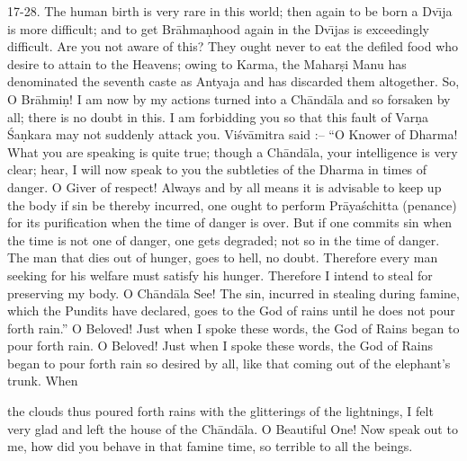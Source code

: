 17-28. The human birth is very rare in this world; then again to be born a Dv\={\i}ja is more difficult; and to get Br\=ahma\d{n}hood again in the Dv\={\i}jas is exceedingly difficult. Are you not aware of this? They ought never to eat the defiled food who desire to attain to the Heavens; owing to Karma, the Mahar\d{s}i Manu has denominated the seventh caste as Antyaja and has discarded them altogether. So, O Br\=ahmi\d{n}! I am now by my actions turned into a Ch\=and\=ala and so forsaken by all; there is no doubt in this. I am forbidding you so that this fault of Var\d{n}a \'Sa\d{n}kara may not suddenly attack you. Vi\'sv\=amitra said :-- ``O Knower of Dharma! What you are speaking is quite true; though a Ch\=and\=ala, your intelligence is very clear; hear, I will now speak to you the subtleties of the Dharma in times of danger. O Giver of respect! Always and by all means it is advisable to keep up the body if sin be thereby incurred, one ought to perform Pr\=aya\'schitta (penance) for its purification when the time of danger is over. But if one commits sin when the time is not one of danger, one gets degraded; not so in the time of danger. The man that dies out of hunger, goes to hell, no doubt. Therefore every man seeking for his welfare must satisfy his hunger. Therefore I intend to steal for preserving my body. O Ch\=and\=ala See! The sin, incurred in stealing during famine, which the Pundits have declared, goes to the God of rains until he does not pour forth rain.'' O Beloved! Just when I spoke these words, the God of Rains began to pour forth rain. O Beloved! Just when I spoke these words, the God of Rains began to pour forth rain so desired by all, like that coming out of the elephant's trunk. When

the clouds thus poured forth rains with the glitterings of the lightnings, I felt very glad and left the house of the Ch\=and\=ala. O Beautiful One! Now speak out to me, how did you behave in that famine time, so terrible to all the beings.

